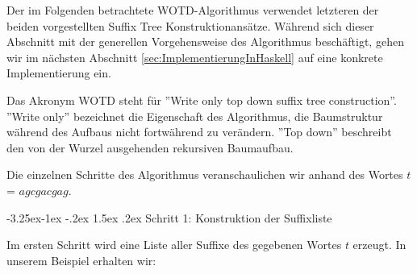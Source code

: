 \documentclass[12pt]{report}
\makeatletter
\renewcommand\paragraph{\@startsection{paragraph}{4}{\z@}%
    {-3.25ex\@plus -1ex \@minus -.2ex}%
    {1.5ex \@plus .2ex}%
    {\normalfont\normalsize\bfseries}}
\makeatother
\begin{document}
Der im Folgenden betrachtete WOTD-Algorithmus verwendet letzteren der beiden vorgestellten Suffix Tree Konstruktionansätze. Während sich dieser Abschnitt mit der generellen Vorgehensweise des Algorithmus beschäftigt, gehen wir im nächsten Abschnitt \ref{sec:ImplementierungInHaskell} auf eine konkrete Implementierung ein.

Das Akronym WOTD steht für ''Write only top down suffix tree construction''. ''Write only'' bezeichnet die Eigenschaft des Algorithmus, die Baumstruktur während des Aufbaus nicht fortwährend zu verändern. ''Top down'' beschreibt den von der Wurzel ausgehenden rekursiven Baumaufbau.


Die einzelnen Schritte des Algorithmus veranschaulichen wir anhand des Wortes $t$ = $agcgacgag$.

\paragraph{Schritt 1: Konstruktion der Suffixliste}

Im ersten Schritt wird eine Liste aller Suffixe des gegebenen Wortes $t$ erzeugt. In unserem Beispiel erhalten wir:
\begin{gather*}
[agcgacgag, gcgacgag, cgacgag, gacgag, acgag, cgag, gag, ag, g]
\end{gather*}

\end{document}

